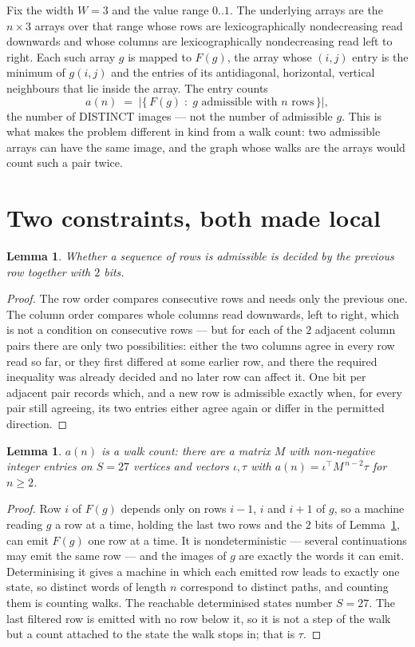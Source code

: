 \documentclass[11pt,a4paper]{article}
\theoremstyle{plain}
\newtheorem{lemma}[theorem]{Lemma}
\theoremstyle{definition}
\begin{document}
Fix the width $W=3$ and the value range $0..1$. The underlying arrays are the
$n\times3$ arrays over that range whose rows are lexicographically nondecreasing read downwards
and whose columns are lexicographically nondecreasing read left to right. Each such array $g$
is mapped to $F(g)$, the array whose $(i,j)$ entry is the minimum of $g(i,j)$ and the entries
of its antidiagonal, horizontal, vertical neighbours that lie inside the array. The entry counts
\[
a(n)\;=\;\bigl|\{\,F(g)\;:\;g\text{ admissible with }n\text{ rows}\,\}\bigr|,
\]
the number of DISTINCT images --- not the number of admissible $g$. This is what makes the
problem different in kind from a walk count: two admissible arrays can have the same image, and
the graph whose walks are the arrays would count such a pair twice.

\section{Two constraints, both made local}

\begin{lemma}\label{lem:local}
Whether a sequence of rows is admissible is decided by the previous row together with
$2$ bits.
\end{lemma}

\begin{proof}
The row order compares consecutive rows and needs only the previous one. The column order
compares whole columns read downwards, left to right, which is not a condition on consecutive
rows --- but for each of the $2$ adjacent column pairs there are only two possibilities:
either the two columns agree in every row read so far, or they first differed at some earlier
row, and there the required inequality was already decided and no later row can affect it. One
bit per adjacent pair records which, and a new row is admissible exactly when, for every pair
still agreeing, its two entries either agree again or differ in the permitted direction.
\end{proof}

\begin{lemma}\label{lem:det}
$a(n)$ is a walk count: there are a matrix $M$ with non-negative integer entries on $S=27$
vertices and vectors $\iota,\tau$ with $a(n)=\iota^{\!\top}M^{\,n-2}\tau$ for $n\ge2$.
\end{lemma}

\begin{proof}
Row $i$ of $F(g)$ depends only on rows $i-1$, $i$ and $i+1$ of $g$, so a machine reading $g$ a
row at a time, holding the last two rows and the $2$ bits of Lemma~\ref{lem:local}, can
emit $F(g)$ one row at a time. It is nondeterministic --- several continuations may emit the
same row --- and the images of $g$ are exactly the words it can emit. Determinising it gives a
machine in which each emitted row leads to exactly one state, so distinct words of length $n$
correspond to distinct paths, and counting them is counting walks. The reachable determinised
states number $S=27$. The last filtered row is emitted with no row below it, so it is not a
step of the walk but a count attached to the state the walk stops in; that is $\tau$.
\end{proof}
\end{document}
